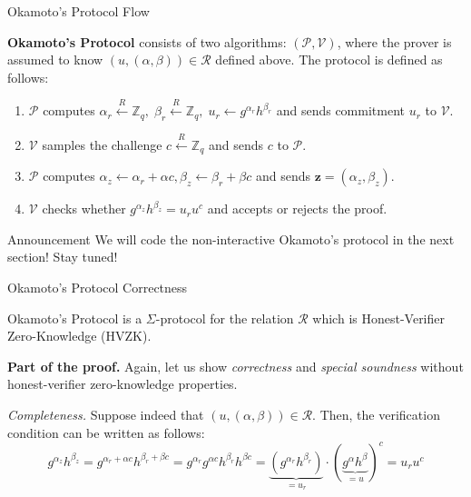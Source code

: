\documentclass[xcolor={usenames,dvipsnames}]{beamer}
\begin{document}
    \begin{frame}{Okamoto's Protocol Flow}
        \begin{definition}
            \textbf{Okamoto's Protocol} consists of two algorithms: $(\mathcal{P}, \mathcal{V})$, where the prover is assumed to know $(u,(\alpha,\beta)) \in \mathcal{R}$ defined above. The protocol is defined as follows:
            \begin{enumerate}
                \item $\mathcal{P}$ computes $\alpha_r \xleftarrow{R} \mathbb{Z}_q, \; \beta_r \xleftarrow{R} \mathbb{Z}_q, \; u_r \gets g^{\alpha_r}h^{\beta_r}$ and sends commitment $u_r$ to $\mathcal{V}$.
                \item $\mathcal{V}$ samples the challenge $c \xleftarrow{R} \mathbb{Z}_q$ and sends $c$ to $\mathcal{P}$.
                \item $\mathcal{P}$ computes $\alpha_z \gets \alpha_r + \alpha c, \beta_z \gets \beta_r + \beta c$ and sends $\mathbf{z} = (\alpha_z,\beta_z)$.
                \item $\mathcal{V}$ checks whether $g^{\alpha_z}h^{\beta_z} = u_r u^c$ and accepts or rejects the proof.
            \end{enumerate}
        \end{definition}

        \begin{alertblock}{Announcement}
            We will code the non-interactive Okamoto's protocol in the next section! Stay tuned!
        \end{alertblock}
    \end{frame}

    \begin{frame}{Okamoto's Protocol Correctness}
        \begin{theorem}
            Okamoto's Protocol is a $\Sigma$-protocol for the relation $\mathcal{R}$ which is Honest-Verifier Zero-Knowledge (HVZK).
        \end{theorem}
        
        \textbf{Part of the proof.} Again, let us show \textit{correctness} and \textit{special soundness} without honest-verifier zero-knowledge properties.
        
        \textit{Completeness.} Suppose indeed that $(u,(\alpha,\beta)) \in \mathcal{R}$. Then, the verification condition can be written as follows:
        \begin{equation*}
            g^{\alpha_z}h^{\beta_z} = g^{\alpha_r + \alpha c}h^{\beta_r + \beta c} = g^{\alpha_r}g^{\alpha c}h^{\beta_r}h^{\beta c} = \underbrace{(g^{\alpha_r}h^{\beta_r})}_{=u_r} \cdot (\underbrace{g^{\alpha}h^{\beta}}_{=u})^c = u_r u^c
        \end{equation*}
    \end{frame}
\end{document}
